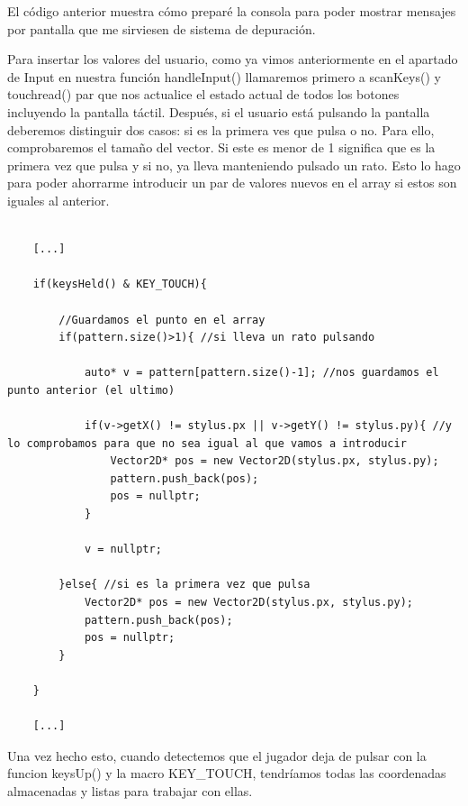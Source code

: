 \vspace{0.5cm}

El código anterior muestra cómo preparé la consola para poder mostrar mensajes por pantalla que me sirviesen de sistema de depuración.

\vspace{0.5cm}

Para insertar los valores del usuario, como ya vimos anteriormente en el apartado de Input en nuestra función handleInput() llamaremos primero a scanKeys() y touchread() par que nos actualice el estado actual de todos los botones incluyendo la pantalla táctil. Después, si el usuario está pulsando la pantalla deberemos distinguir dos casos: si es la primera ves que pulsa o no. Para ello, comprobaremos el tamaño del vector. Si este es menor de 1 significa que es la primera vez que pulsa y si no, ya lleva manteniendo pulsado un rato. Esto lo hago para poder ahorrarme introducir un par de valores nuevos en el array si estos son iguales al anterior.

\vspace{0.5cm}

\begin{lstlisting}[caption={Inserción de valores que conforman el trazo}, label={code:push_back}]

	[...]
	
	if(keysHeld() & KEY_TOUCH){
		
		//Guardamos el punto en el array
		if(pattern.size()>1){ //si lleva un rato pulsando

			auto* v = pattern[pattern.size()-1]; //nos guardamos el punto anterior (el ultimo)

			if(v->getX() != stylus.px || v->getY() != stylus.py){ //y lo comprobamos para que no sea igual al que vamos a introducir
				Vector2D* pos = new Vector2D(stylus.px, stylus.py);
				pattern.push_back(pos);
				pos = nullptr;
			}

			v = nullptr;

		}else{ //si es la primera vez que pulsa
			Vector2D* pos = new Vector2D(stylus.px, stylus.py);
			pattern.push_back(pos);
			pos = nullptr;
		}
		
	}
	
	[...]

\end{lstlisting}

\vspace{0.5cm}

Una vez hecho esto, cuando detectemos que el jugador deja de pulsar con la funcion keysUp() y la macro KEY\_TOUCH, tendríamos todas las coordenadas almacenadas y listas para trabajar con ellas.

